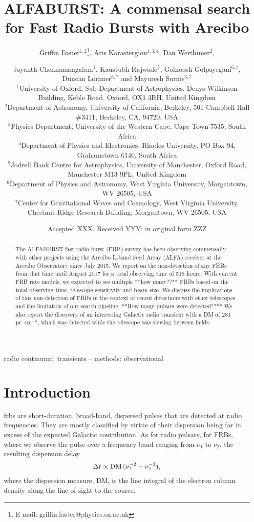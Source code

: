 \documentclass[a4paper,fleqn,usenatbib]{mnras}
\title[The ALFABURST Commensal FRB Survey]{ALFABURST: A commensal search for
Fast Radio Bursts with Arecibo}
\author[G. Foster et al.]{Griffin Foster$^{1,2}$\thanks{E-mail: griffin.foster@physics.ox.ac.uk},
Aris Karastergiou$^{1,3,4}$,
Dan Werthimer$^{2}$,
\and Jayanth Chennamangalam$^{1}$,
Kaustubh Rajwade$^{5}$,
Golnoosh Golpayegani$^{6,7}$,\\
Duncan Lorimer$^{6,7}$
and Mayuresh Surnis$^{6,7}$
\\
$^{1}$University of Oxford, Sub-Department of Astrophysics, Denys Wilkinson Building, Keble Road, Oxford, OX1 3RH, United Kingdom\\
$^{2}$Department of Astronomy, University of California, Berkeley, 501 Campbell Hall \#3411, Berkeley, CA, 94720, USA\\
$^{3}$Physics Department, University of the Western Cape, Cape Town 7535, South Africa\\
$^{4}$Department of Physics and Electronics, Rhodes University, PO Box 94, Grahamstown 6140, South Africa\\
$^{5}$Jodrell Bank Centre for Astrophysics, University of Manchester, Oxford Road, Manchester M13 9PL, United Kingdom\\ 
$^{6}$Department of Physics and Astronomy, West Virginia University, Morgantown, WV 26505, USA\\
$^{7}$Center for Gravitational Waves and Cosmology, West Virginia University, Chestnut Ridge Research Building, Morgantown, WV 26505, USA\\
}
\date{Accepted XXX. Received YYY; in original form ZZZ}
\begin{document}
\label{firstpage}
\pagerange{\pageref{firstpage}--\pageref{lastpage}}
\maketitle

\begin{abstract}
The ALFABURST fast radio burst (FRB) survey has been observing commensally with
other projects using the Arecibo L-band Feed Array (ALFA) receiver at the
Arecibo Observatory since July 2015. We report on the non-detection of any FRBs
from that time until August 2017 for a total observing time of 518 hours.
With current FRB rate models, we expected to see multiple **how many??** FRBs based on the
total observing time, telescope sensitivity and beam size. We discuss the
implications of this non-detection of FRBs in the context of recent detections
with other telescopes and the limitation of our search pipeline. **How many pulsars were
detected??** We also report
the discovery of an interesting Galactic radio transient with a DM of 281 pc~cm$^{-3}$, which was detected while the telescope was slewing between fields.
\end{abstract}

\begin{keywords}
radio continuum: transients -- methods: observational
\end{keywords}



\section{Introduction}
\label{sec:intro}

\glspl{frb} are short-duration, broad-band, dispersed pulses that are detected
at radio frequencies. They are mostly classified by virtue of their dispersion
being far in excess of the expected Galactic contribution. As for radio pulsars,
for FRBs, where we observe the pulse over a frequency band ranging from $\nu_1$ to $\nu_2$,
the resulting dispersion delay 
%
\begin{equation}
\Delta t \propto {\rm DM} \, (\nu_1^{-2} - \nu_2^{-2}),
\end{equation}
%
where the dispersion measure, DM, is the line integral of
the electron column density along the line of sight to the source.
\end{document}

